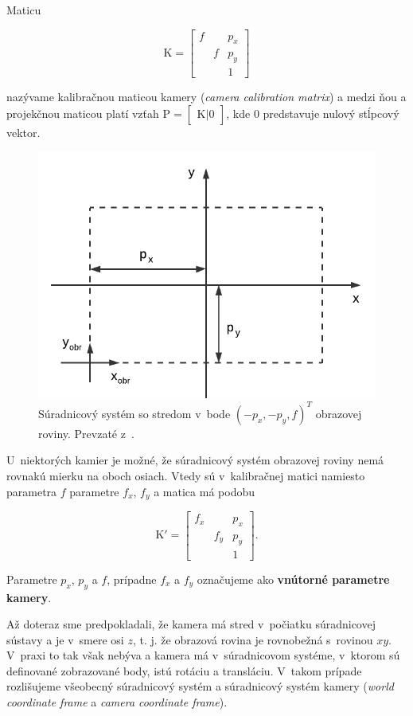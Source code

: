 Maticu

$$ \mathrm{K} 
=
\begin{bmatrix}
f &   &  p_x \\
  & f &  p_y \\
  &   &   1  
\end{bmatrix}
$$

nazývame kalibračnou maticou kamery (\emph{camera calibration matrix}) a medzi ňou a projekčnou maticou platí vzťah
$\mathrm{P} = \begin{bmatrix} \mathrm{K} | 0 \end{bmatrix}$, kde $0$ predstavuje nulový stĺpcový vektor.

\begin{figure}[h!]
    \centering
    \includegraphics[width=0.7\linewidth]{text_prace/obrazky-figures/model_kamery3.pdf}
    \caption[Súradnicový systém so stredom v~bode $(-p_x, -p_y, f)^T$ obrazovej roviny.]{Súradnicový systém so stredom v~bode $(-p_x, -p_y, f)^T$ obrazovej roviny. Prevzaté z~\cite{multiple_view_geometry}.}
    \label{fig:model_kamery3}
\end{figure}

U~niektorých kamier je možné, že súradnicový systém obrazovej roviny nemá rovnakú mierku na oboch osiach. Vtedy sú v~kalibračnej matici namiesto parametra $f$ parametre $f_x$, $f_y$ a matica má podobu

$$ \mathrm{K'} 
=
\begin{bmatrix}
f_x &     &  p_x \\
    & f_y &  p_y \\
    &     &   1  
\end{bmatrix} \mathrm{.}
$$

Parametre $p_x$, $p_y$ a $f$, prípadne $f_x$ a $f_y$ označujeme ako \textbf{vnútorné parametre kamery}.

Až doteraz sme predpokladali, že kamera má stred v~počiatku súradnicovej sústavy a je  v~smere osi $z$, t. j. že obrazová rovina je rovnobežná s~rovinou $xy$. V~praxi to tak však nebýva a kamera má v~súradnicovom systéme, v~ktorom sú definované zobrazované body, istú rotáciu a transláciu. V~takom prípade rozlišujeme všeobecný súradnicový systém a súradnicový systém kamery (\emph{world coordinate frame} a \emph{camera coordinate frame}).


